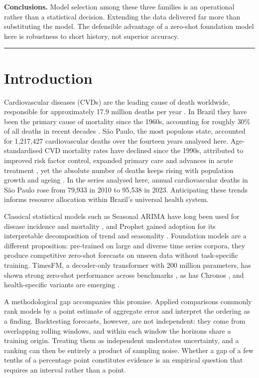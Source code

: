 \noindent\textbf{Conclusions.} Model selection among these three families is an
operational rather than a statistical decision. Extending the data delivered far more
than substituting the model. The defensible advantage of a zero-shot foundation model
here is robustness to short history, not superior accuracy.

\vspace{1em}
\hrule

\section{Introduction}

Cardiovascular diseases (CVDs) are the leading cause of death worldwide, responsible for
approximately 17.9 million deaths per year \citep{roth2020}. In Brazil they have been the
primary cause of mortality since the 1960s, accounting for roughly 30\% of all deaths in
recent decades \citep{oliveira2020, brant2017}. S\~ao Paulo, the most populous state,
accounted for 1{,}217{,}427 cardiovascular deaths over the fourteen years analysed here.
Age-standardised CVD mortality rates
have declined since the 1990s, attributed to improved risk factor control, expanded primary
care and advances in acute treatment \citep{ribeiro2016}, yet the absolute number of deaths
keeps rising with population growth and ageing \citep{brant2025}. In the series analysed
here, annual cardiovascular deaths in S\~ao Paulo rose from 79{,}933 in 2010 to 95{,}538 in
2023. Anticipating these trends informs resource allocation within Brazil's universal
health system.

Classical statistical models such as Seasonal ARIMA have long been used for disease
incidence and mortality \citep{box2015}, and Prophet gained adoption for its interpretable
decomposition of trend and seasonality \citep{taylor2018}. Foundation models are a
different proposition: pre-trained on large and diverse time series corpora, they produce
competitive zero-shot forecasts on unseen data without task-specific training. TimesFM, a
decoder-only transformer with 200 million parameters, has shown strong zero-shot
performance across benchmarks \citep{das2024}, as has Chronos \citep{ansari2024}, and
health-specific variants are emerging \citep{li2025}.

A methodological gap accompanies this promise. Applied comparisons commonly rank models by
a point estimate of aggregate error and interpret the ordering as a finding. Backtesting
forecasts, however, are not independent: they come from overlapping rolling windows, and
within each window the horizons share a training origin. Treating them as independent
understates uncertainty, and a ranking can then be entirely a product of sampling noise.
Whether a gap of a few tenths of a percentage point constitutes evidence is an empirical
question that requires an interval rather than a point.

